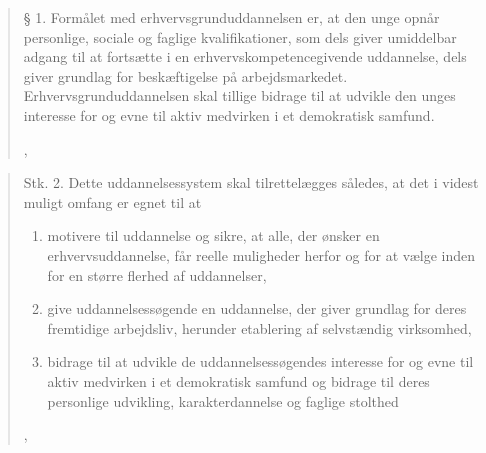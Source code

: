 \blockquote[,  \cite{uddannelsesministerietBekendtgorelseAfLov2016a}]{
§ 1. Formålet med erhvervsgrunduddannelsen er, at den unge opnår personlige, sociale og faglige kvalifikationer, som dels giver umiddelbar adgang til at fortsætte i en erhvervskompetencegivende uddannelse, dels giver grundlag for beskæftigelse på arbejdsmarkedet. 
Erhvervsgrunduddannelsen skal tillige bidrage til at udvikle den unges interesse for og evne til aktiv medvirken i et demokratisk samfund.
}
\blockquote[,  \cite{uddannelsesministerietBekendtgorelseAfLov2020}]{
Stk. 2. Dette uddannelsessystem skal tilrettelægges således, at det i videst muligt omfang er egnet til at
\begin{enumerate}
  \item
    motivere til uddannelse og sikre, at alle, der ønsker en erhvervsuddannelse, får reelle muligheder herfor og for at vælge inden for en større flerhed af uddannelser,

  \item
    give uddannelsessøgende en uddannelse, der giver grundlag for deres fremtidige arbejdsliv, herunder etablering af selvstændig virksomhed,

  \item
    bidrage til at udvikle de uddannelsessøgendes interesse for og evne til aktiv medvirken i et demokratisk samfund og bidrage til deres personlige udvikling, karakterdannelse og faglige stolthed
\textins[\ldots]
\end{enumerate}
}
